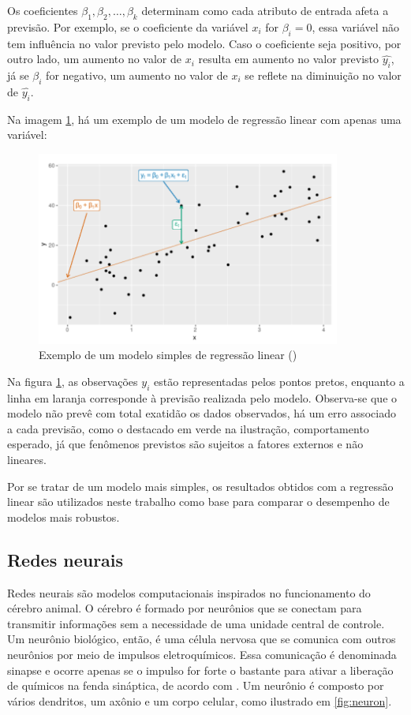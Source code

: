 Os coeficientes $\beta_1, \beta_2, \dots, \beta_k$ 
determinam como cada atributo de entrada afeta a previsão.
Por exemplo, se o coeficiente da variável $x_i$ for $\beta_i = 0$,
essa variável não tem influência no valor previsto pelo modelo. 
Caso o coeficiente seja positivo, por outro lado, um aumento 
no valor de $x_i$ resulta em aumento no valor previsto $\hat{y_i}$,
já se $\beta_i$ for negativo, um aumento no valor de $x_i$ se reflete na 
diminuição no valor de $\hat{y_i}$. 


Na imagem \ref{fig:reg_lin}, há um exemplo de um modelo de regressão 
linear com apenas uma variável:

\begin{figure}[H] 
  \includegraphics[width= 10cm]{../figuras/reg_lin.png}
  \caption{Exemplo de um modelo simples de regressão linear
  (\cite{forecasting})}
  \label{fig:reg_lin}
\end{figure}

Na  figura \ref{fig:reg_lin}, as observações $y_i$ estão 
representadas pelos pontos pretos, enquanto a linha em laranja
corresponde à previsão realizada pelo modelo. Observa-se que
o modelo não prevê com total exatidão os dados observados, há 
um erro associado a cada previsão, como o destacado em verde 
na ilustração, comportamento esperado, já que fenômenos previstos são 
sujeitos a fatores externos e não lineares.


Por se tratar de um modelo mais simples, os resultados obtidos
com a regressão linear são utilizados neste trabalho como base 
para comparar o desempenho de modelos mais robustos.

\subsection{Redes neurais}

Redes neurais são modelos computacionais inspirados no funcionamento
do cérebro animal. O cérebro é formado por neurônios que se
conectam para transmitir informações sem a necessidade de 
uma unidade central de controle. Um neurônio biológico, então, 
é uma célula nervosa que se comunica com outros neurônios 
por meio de impulsos eletroquímicos. Essa comunicação é 
denominada sinapse e ocorre apenas se o impulso 
for forte o bastante para ativar a liberação de
químicos na fenda sináptica, de acordo com \cite{deeplearningbook}. 
Um neurônio é composto por vários dendritos, 
um axônio e um corpo celular, como ilustrado em \ref{fig:neuron}. 

